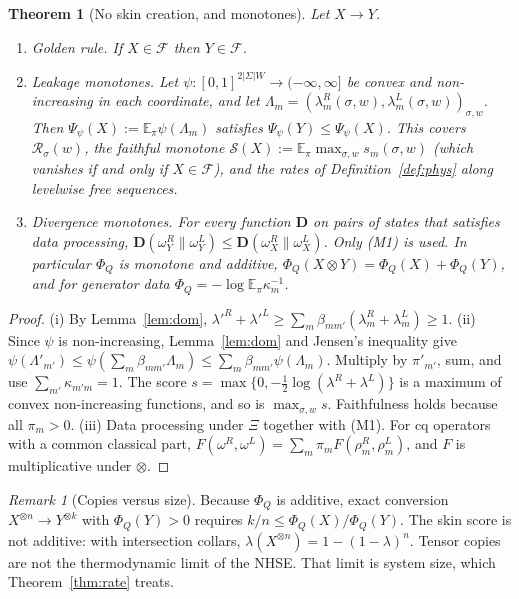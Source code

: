 \documentclass[11pt]{article}
\newtheorem{theorem}{Theorem}
\theoremstyle{definition}
\theoremstyle{remark}
\newtheorem{remark}{Remark}
\newcommand{\E}{\mathbb{E}}
\newcommand{\Free}{\mathcal{F}}
\begin{document}
\begin{theorem}[No skin creation, and monotones]\label{thm:mono}
Let $X\to Y$.
\begin{enumerate}
\item[(i)] \emph{Golden rule.} If $X\in\Free$ then $Y\in\Free$.
\item[(ii)] \emph{Leakage monotones.} Let $\psi:[0,1]^{2|\Sigma|W}\to(-\infty,\infty]$ be convex and non-increasing in each coordinate, and let $\Lambda_m=(\lambda^R_m(\sigma,w),\lambda^L_m(\sigma,w))_{\sigma,w}$. Then $\Psi_\psi(X):=\E_\pi\psi(\Lambda_m)$ satisfies $\Psi_\psi(Y)\le\Psi_\psi(X)$. This covers $\mathcal R_\sigma(w)$, the faithful monotone $\mathcal S(X):=\E_\pi\max_{\sigma,w}s_m(\sigma,w)$ (which vanishes if and only if $X\in\Free$), and the rates of Definition~\ref{def:phys} along levelwise free sequences.
\item[(iii)] \emph{Divergence monotones.} For every function $\mathbf D$ on pairs of states that satisfies data processing, $\mathbf D(\omega^R_Y\|\omega^L_Y)\le\mathbf D(\omega^R_X\|\omega^L_X)$. Only (M1) is used. In particular $\Phi_Q$ is monotone and additive, $\Phi_Q(X\otimes Y)=\Phi_Q(X)+\Phi_Q(Y)$, and for generator data $\Phi_Q=-\log\E_\pi\kappa_m^{-1}$.
\end{enumerate}
\end{theorem}
\begin{proof}
(i) By Lemma~\ref{lem:dom}, $\lambda'^R+\lambda'^L\ge\sum_m\beta_{mm'}(\lambda^R_m+\lambda^L_m)\ge1$.
(ii) Since $\psi$ is non-increasing, Lemma~\ref{lem:dom} and Jensen's inequality give $\psi(\Lambda'_{m'})\le\psi(\sum_m\beta_{mm'}\Lambda_m)\le\sum_m\beta_{mm'}\psi(\Lambda_m)$. Multiply by $\pi'_{m'}$, sum, and use $\sum_{m'}\kappa_{m'm}=1$. The score $s=\max\{0,-\frac12\log(\lambda^R+\lambda^L)\}$ is a maximum of convex non-increasing functions, and so is $\max_{\sigma,w}s$. Faithfulness holds because all $\pi_m>0$.
(iii) Data processing under $\Xi$ together with (M1). For cq operators with a common classical part, $F(\omega^R,\omega^L)=\sum_m\pi_mF(\rho^R_m,\rho^L_m)$, and $F$ is multiplicative under $\otimes$.
\end{proof}

\begin{remark}[Copies versus size]\label{rem:copies}
Because $\Phi_Q$ is additive, exact conversion $X^{\otimes n}\to Y^{\otimes k}$ with $\Phi_Q(Y)>0$ requires $k/n\le\Phi_Q(X)/\Phi_Q(Y)$. The skin score is not additive: with intersection collars, $\lambda(X^{\otimes n})=1-(1-\lambda)^n$. Tensor copies are not the thermodynamic limit of the NHSE. That limit is system size, which Theorem~\ref{thm:rate} treats.
\end{remark}
\end{document}
